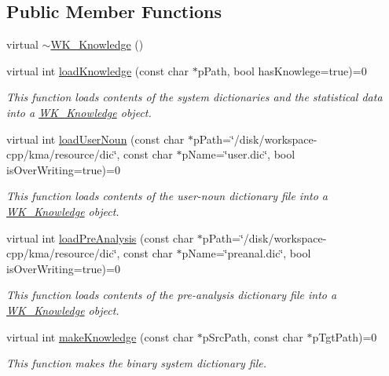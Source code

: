 \subsection*{Public Member Functions}
\begin{CompactItemize}
\item 
virtual \hyperlink{classWK__Knowledge_fc9a3d81b7755e64aba7ba4d48494457}{$\sim$WK\_\-Knowledge} ()
\item 
virtual int \hyperlink{classWK__Knowledge_0d5580699f2b12ebee77e72ac95d45d2}{loadKnowledge} (const char $\ast$pPath, bool hasKnowlege=true)=0
\begin{CompactList}\small\item\em This function loads contents of the system dictionaries and the statistical data into a \hyperlink{classWK__Knowledge}{WK\_\-Knowledge} object. \item\end{CompactList}\item 
virtual int \hyperlink{classWK__Knowledge_08574e4818e76b18fb58c4b4eec1d6aa}{loadUserNoun} (const char $\ast$pPath=\char`\"{}/disk/workspace-cpp/kma/resource/dic\char`\"{}, const char $\ast$pName=\char`\"{}user.dic\char`\"{}, bool isOverWriting=true)=0
\begin{CompactList}\small\item\em This function loads contents of the user-noun dictionary file into a \hyperlink{classWK__Knowledge}{WK\_\-Knowledge} object. \item\end{CompactList}\item 
virtual int \hyperlink{classWK__Knowledge_9c8847731efad49fa0e4385325e2d4b7}{loadPreAnalysis} (const char $\ast$pPath=\char`\"{}/disk/workspace-cpp/kma/resource/dic\char`\"{}, const char $\ast$pName=\char`\"{}preanal.dic\char`\"{}, bool isOverWriting=true)=0
\begin{CompactList}\small\item\em This function loads contents of the pre-analysis dictionary file into a \hyperlink{classWK__Knowledge}{WK\_\-Knowledge} object. \item\end{CompactList}\item 
virtual int \hyperlink{classWK__Knowledge_0ad630181c1519d316d2d2cdf28a270e}{makeKnowledge} (const char $\ast$pSrcPath, const char $\ast$pTgtPath)=0
\begin{CompactList}\small\item\em This function makes the binary system dictionary file. \item\end{CompactList}\end{CompactItemize}
